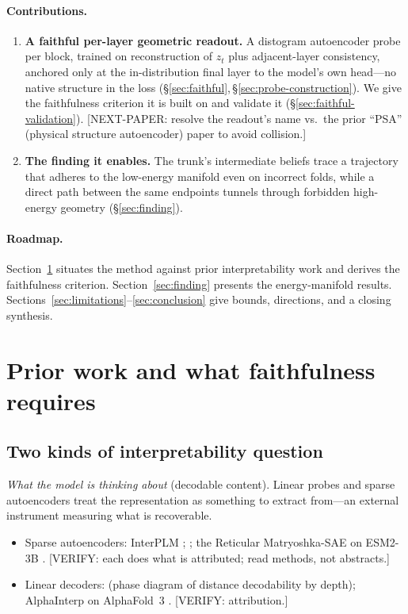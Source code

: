\documentclass[11pt]{article}
\newcommand{\VERIFY}[1]{{\color{red}\small\textsf{[VERIFY: #1]}}}
\newcommand{\NEXTPAPER}[1]{{\color{gray}\small\textsf{[NEXT-PAPER: #1]}}}
\begin{document}
\paragraph{Contributions.}
\begin{enumerate}[leftmargin=1.3em,itemsep=2pt]
\item \textbf{A faithful per-layer geometric readout.} A distogram autoencoder
  probe per block, trained on reconstruction of $z_t$ plus adjacent-layer
  consistency, anchored only at the in-distribution final layer to the model's
  own head---no native structure in the loss
  (\S\ref{sec:faithful},\,\S\ref{sec:probe-construction}). We give the
  faithfulness criterion it is built on and validate it
  (\S\ref{sec:faithful-validation}).
  \NEXTPAPER{resolve the readout's name vs.\ the prior ``PSA'' (physical
  structure autoencoder) paper to avoid collision.}
\item \textbf{The finding it enables.} The trunk's intermediate beliefs trace a
  trajectory that adheres to the low-energy manifold even on incorrect folds,
  while a direct path between the same endpoints tunnels through forbidden
  high-energy geometry (\S\ref{sec:finding}). 
\end{enumerate}

\paragraph{Roadmap.}
Section~\ref{sec:prior} situates the method against prior interpretability work
and derives the faithfulness criterion. Section~\ref{sec:finding} presents the
energy-manifold results. Sections~\ref{sec:limitations}--\ref{sec:conclusion}
give bounds, directions, and a closing synthesis.

\section{Prior work and what faithfulness requires}
\label{sec:prior}

\subsection{Two kinds of interpretability question}
\label{sec:two-questions}

\emph{What the model is thinking about} (decodable content). Linear probes and
sparse autoencoders treat the representation as something to extract from---an
external instrument measuring what is recoverable.
\begin{itemize}[leftmargin=1.3em,itemsep=1pt]
\item Sparse autoencoders: InterPLM \citep{simon_interplm};
  \citet{adams_sae}; the Reticular Matryoshka-SAE on ESM2-3B
  \citep{reticular_msae}. \VERIFY{each does what is attributed; read methods, not
  abstracts.}
\item Linear decoders: \citet{lu2026phase} (phase diagram of distance
  decodability by depth); AlphaInterp on AlphaFold~3 \citep{alphainterp}.
  \VERIFY{attribution.}
\end{itemize}
\end{document}
